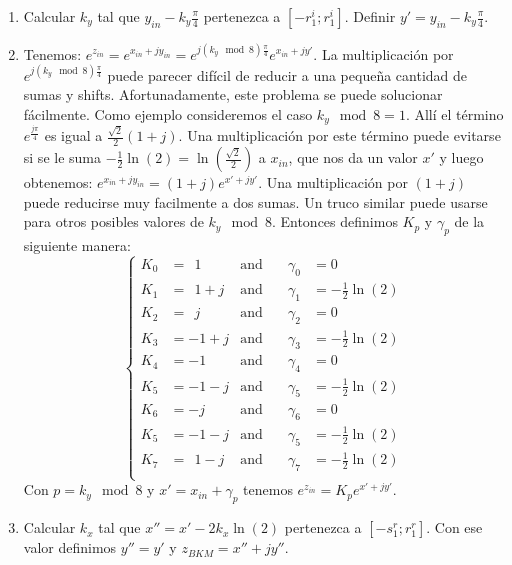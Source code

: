 \documentclass[10pt,a4paper]{book}
\begin{document}
   \begin{enumerate}
      \item{Calcular $k_y$ tal que $y_{in} - k_y \frac{\pi}{4}$ pertenezca a $[-r_1^i; r_1^i]$. Definir $y'=y_{in} - k_y \frac{\pi}{4}$.}
      \item{Tenemos: $e^{z_{in}}=e^{x_{in}+jy_{in}}=e^{j(k_y \mod 8)\frac{\pi}{4}}e^{x_{in}+jy'}$. La multiplicación por $e^{j(k_y \mod 8)\frac{\pi}{4}}$ puede parecer difícil de reducir a una pequeña cantidad de sumas y shifts. Afortunadamente, este problema se puede solucionar fácilmente. Como ejemplo consideremos el caso $k_y \mod 8 = 1$. Allí el término $e^{\frac{j\pi}{4}}$ es igual a $\frac{\sqrt{2}}{2} (1+j)$. Una multiplicación por este término puede evitarse si se le suma
         $-\frac{1}{2}\ln(2)=\ln(\frac{\sqrt{2}}{2})$ a $x_{in}$, que nos da un valor $x'$ y luego obtenemos: $e^{x_{in}+jy_{in}} = (1+j)e^{x'+jy'}$. Una multiplicación por $(1+j)$ puede reducirse muy facilmente a dos sumas. Un truco similar puede usarse para otros posibles valores de $k_y\mod 8$. Entonces definimos $K_p$ y $\gamma_p$ de la siguiente manera:
         \begin{equation} \label{eq:E_range_ext_2}
            \left\{
               \begin{aligned}
                  K_0 &=\ \ 1    & \text{and} \quad & \gamma_0 &= 0                  \\
                  K_1 &=\ \ 1+j  & \text{and} \quad & \gamma_1 &= -\frac{1}{2}\ln(2) \\
                  K_2 &=\ \ j    & \text{and} \quad & \gamma_2 &= 0                  \\
                  K_3 &= -1+j    & \text{and} \quad & \gamma_3 &= -\frac{1}{2}\ln(2) \\
                  K_4 &= -1      & \text{and} \quad & \gamma_4 &= 0                  \\
                  K_5 &= -1-j    & \text{and} \quad & \gamma_5 &= -\frac{1}{2}\ln(2) \\
                  K_6 &= -j      & \text{and} \quad & \gamma_6 &= 0                  \\
                  K_5 &= -1-j    & \text{and} \quad & \gamma_5 &= -\frac{1}{2}\ln(2) \\
                  K_7 &=\ \ 1-j  & \text{and} \quad & \gamma_7 &= -\frac{1}{2}\ln(2) \\
               \end{aligned}
            \right.
         \end{equation}
         Con $p= k_y \mod 8$ y $x'=x_{in}+\gamma_p$ tenemos $e^{z_{in}} = K_p e^{x'+jy'}$.
      }


   \item{Calcular $k_x$ tal que $x''=x'-2k_x\ln(2)$ pertenezca a $[-s_1^r; r_1^r]$. Con ese valor definimos $y''=y'$ y $z_{BKM} = x''+jy''$. }
   \end{enumerate}
\end{document}
